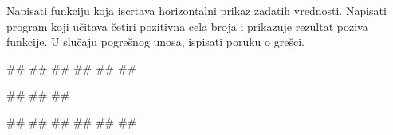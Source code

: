 \begin{Exercise}[label=p1.4_05] 
Napisati funkciju 
koja iscrtava horizontalni prikaz zadatih vrednosti. Napisati program
koji učitava četiri pozitivna cela broja i prikazuje rezultat poziva
funkcije. U slučaju pogrešnog unosa, ispisati poruku o grešci.
 
\begin{miditest}
\begin{upotreba}{1}
#\naslovInt#
##
#\izlaz{****}#
#\izlaz{*}#
#\izlaz{*******}#
#\izlaz{*****}#
\end{upotreba}
\end{miditest}
\begin{miditest}
\begin{upotreba}{2}
#\naslovInt#
##
##
\end{upotreba}
\end{miditest}

\begin{miditest}
\begin{upotreba}{3}
#\naslovInt#
##
#\izlaz{*****}#
#\izlaz{**}#
#\izlaz{**}#
#\izlaz{**********}#
\end{upotreba}
\end{miditest}
\end{Exercise}
\begin{Answer}[ref=p1.4_05]
\end{Answer}


